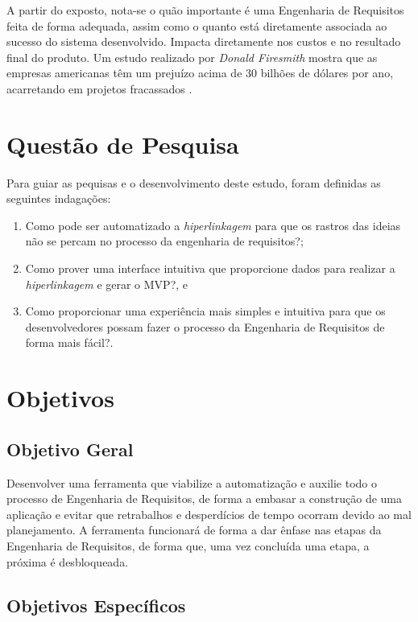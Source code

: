 A partir do exposto, nota-se o quão importante é uma Engenharia de Requisitos feita de forma adequada, assim como o quanto está diretamente associada ao sucesso do sistema desenvolvido. Impacta diretamente nos custos e no resultado final do produto. Um estudo realizado por \textit{Donald Firesmith} mostra que as empresas americanas têm um prejuízo acima de 30 bilhões de dólares por ano, acarretando em projetos fracassados \cite{king2008cost}.

\section{Questão de Pesquisa}

Para guiar as pequisas e o desenvolvimento deste estudo, foram definidas as seguintes indagações:

\begin{enumerate}
    \item Como pode ser automatizado a \textit{hiperlinkagem} para que os rastros das ideias não se percam no processo da engenharia de requisitos?;
    \item Como prover uma interface intuitiva que proporcione dados para realizar a \textit{hiperlinkagem} e gerar o MVP?, e
    \item Como proporcionar uma experiência mais simples e intuitiva para que os desenvolvedores possam fazer o processo da Engenharia de Requisitos de forma mais fácil?.
\end{enumerate}

\section{Objetivos}

\subsection{Objetivo Geral}

Desenvolver uma ferramenta que viabilize a automatização e auxilie todo o processo de Engenharia de Requisitos, de forma a embasar a construção de uma aplicação e evitar que retrabalhos e desperdícios de tempo ocorram devido ao mal planejamento. A ferramenta funcionará de forma a dar ênfase nas etapas da Engenharia de Requisitos, de forma que, uma vez concluída uma etapa, a próxima é desbloqueada.

\subsection{Objetivos Específicos}

